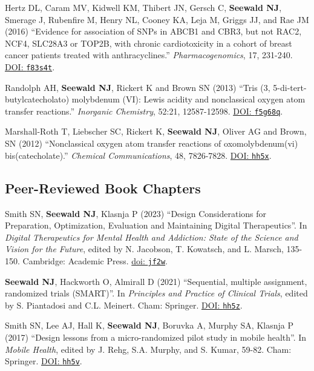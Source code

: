 \documentclass[letterpaper,11pt]{article} %
\begin{document}
\begin{etaremune}
		\item Hertz DL, Caram MV, Kidwell KM, Thibert JN, Gersch C, \textbf{Seewald NJ}, Smerage J, Rubenfire M, Henry NL, Cooney KA, Leja M, Griggs JJ, and Rae JM (2016) ``Evidence for association of SNPs in ABCB1 and CBR3, but not RAC2, NCF4, SLC28A3 or TOP2B, with chronic cardiotoxicity in a cohort of breast cancer patients treated with anthracyclines.'' \textit{Pharmacogenomics}, 17, 231-240. \href{https://doi.org/f83s4t}{DOI: \texttt{f83s4t}}.
			
		\item Randolph AH, \textbf{Seewald NJ}, Rickert K and Brown SN (2013) ``Tris (3, 5-di-tert-butylcate\-cholato) molybdenum (VI): Lewis acidity and nonclassical oxygen atom transfer reactions.'' \textit{Inorganic Chemistry}, 52:21, 12587-12598. \href{https://doi.org/f5g68q}{DOI: \texttt{f5g68q}}.

		\item Marshall-Roth T, Liebscher SC, Rickert K, \textbf{Seewald NJ}, Oliver AG and Brown, SN (2012) ``Nonclassical oxygen atom transfer reactions of oxomolybdenum(vi) bis(catecholate).'' \textit{Chemical Communications}, 48, 7826-7828. \href{https://doi.org/hh5x}{DOI: \texttt{hh5x}}.
	\end{etaremune}

	
	\subsection*{Peer-Reviewed Book Chapters}
	
		\begin{etaremune}			
			\item Smith SN, \textbf{Seewald NJ}, Klasnja P (2023) ``Design Considerations for Preparation, Optimization, Evaluation and Maintaining Digital Therapeutics''. In \textit{Digital Therapeutics for Mental Health and Addiction: State of the Science and Vision for the Future}, edited by N. Jacobson, T. Kowatsch, and L. Marsch, 135-150. Cambridge: Academic Press. \href{https://doi.org/jf2w}{doi: \texttt{jf2w}}.
			
			\item \textbf{Seewald NJ}, Hackworth O, Almirall D (2021) ``Sequential, multiple assignment, randomized trials (SMART)''. In \textit{Principles and Practice of Clinical Trials}, edited by S. Piantadosi and C.L. Meinert. Cham: Springer. \href{https://doi.org/hh5z}{DOI: \texttt{hh5z}}.
			
			\item  Smith SN, Lee AJ, Hall K, \textbf{Seewald NJ}, Boruvka A, Murphy SA, Klasnja P (2017) ``Design lessons from a micro-randomized pilot study in mobile health''. In \textit{Mobile Health}, edited by J. Rehg, S.A. Murphy, and S. Kumar, 59-82. Cham: Springer. \href{https://doi.org/hh5v}{DOI: \texttt{hh5v}}.
		\end{etaremune}
		
\end{document}
